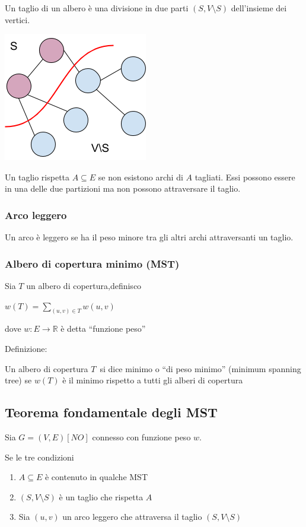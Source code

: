 \documentclass[tikz]{article}
\providecommand{\tightlist}{%
  \setlength{\itemsep}{0pt}\setlength{\parskip}{0pt}}
\begin{document}
{{{Un taglio di un albero è una divisione in due parti $(S,V\setminus S)$ dell'insieme dei vertici.}

{\includegraphics{images/image527.png}}

{Un taglio rispetta $A \subseteq E$ se non esistono archi di $A$ tagliati. Essi possono essere in una delle due partizioni ma non possono attraversare il taglio.}

\subsubsection{Arco leggero}

{Un arco è leggero se ha il peso minore tra gli altri archi attraversanti un taglio.}

\subsubsection{Albero di copertura minimo (MST)}

{Sia $T$ un albero di copertura,definisco}

$w(T) = \sum_{(u,v)\in T}{w(u,v)}$

{dove $w:E\rightarrow \mathbb{R}$ è detta ``funzione peso''}

{Definizione:}

{Un albero di copertura }$T${~si dice minimo o ``di peso minimo'' (minimum spanning tree) se $w(T)$ è il minimo rispetto a tutti gli alberi di copertura}

\subsection{Teorema fondamentale degli MST}

{Sia $G=(V,E) [NO]$ connesso con funzione peso $w$.}

{Se le tre condizioni}

\begin{enumerate}
\tightlist
\item
  {$A \subseteq E$ è contenuto in qualche MST}
\item
  {$(S,V \setminus S)$ è un taglio che rispetta $A$}
\item
  {Sia $(u,v)$ un arco leggero che attraversa il taglio $(S,V \setminus S)$}
\end{enumerate}

}}
\end{document}
